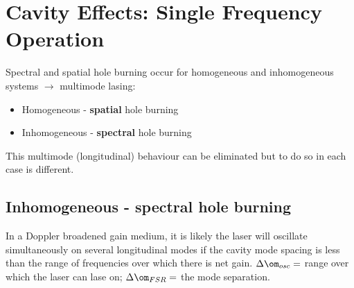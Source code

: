 \documentclass[a4paper, 11pt, normalem]{report}
\begin{document}
\chapter{Cavity Effects: Single Frequency Operation}
Spectral and spatial hole burning occur for homogeneous and inhomogeneous systems $\to$ multimode lasing:
\begin{itemize}
    \item Homogeneous - \textbf{spatial} hole burning
    \item Inhomogeneous - \textbf{spectral} hole burning
\end{itemize}
This multimode (longitudinal) behaviour can be eliminated but to do so in each case is different.

\section{Inhomogeneous - spectral hole burning}
In a Doppler broadened gain medium, it is likely the laser will oscillate simultaneously on several longitudinal modes if the cavity mode spacing is less than the range of frequencies over which there is net gain.
$\Delta\om_{osc} =$ range over which the laser can lase on; $\Delta\om_{FSR} =$ the mode separation.
\end{document}
